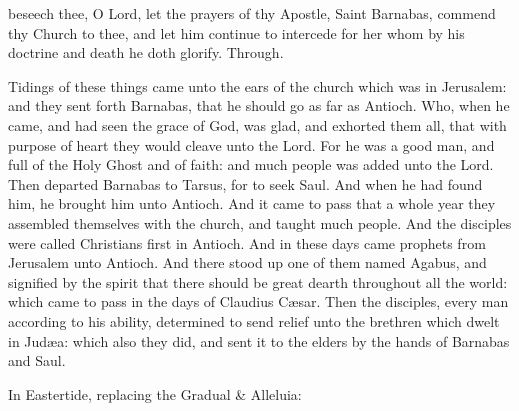 \collect
 beseech thee, O Lord, let the prayers of thy Apostle, Saint Barnabas, commend thy Church to thee, and let him continue to intercede for her whom by his doctrine and death he doth glorify. Through.

\clearpage
{}
 Tidings of these things came unto the ears of the church which was in Jerusalem: and they sent forth Barnabas, that he should go as far as Antioch. Who, when he came, and had seen the grace of God, was glad, and exhorted them all, that with purpose of heart they would cleave unto the Lord. For he was a good man, and full of the Holy Ghost and of faith: and much people was added unto the Lord. Then departed Barnabas to Tarsus, for to seek Saul. And when he had found him, he brought him unto Antioch. And it came to pass that a whole year they assembled themselves with the church, and taught much people. And the disciples were called Christians first in Antioch. And in these days came prophets from Jerusalem unto Antioch. And there stood up one of them named Agabus, and signified by the spirit that there should be great dearth throughout all the world: which came to pass in the days of Claudius C{\ae}sar. Then the disciples, every man according to his ability, determined to send relief unto the brethren which dwelt in Jud{\ae}a: which also they did, and sent it to the elders by the hands of Barnabas and Saul.\\


\begin{rubric}
{In Eastertide, replacing the Gradual \& Alleluia:}
\end{rubric}


